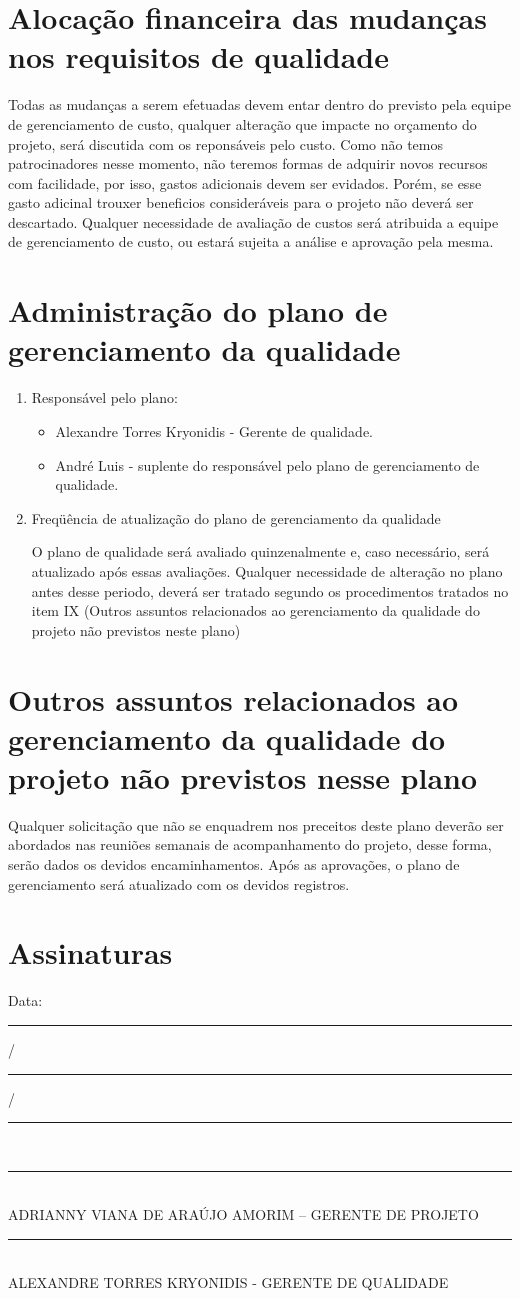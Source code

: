 \documentclass[12pt,openright,oneside,a4paper,brazil]{abntex2}
\begin{document}
\section{Alocação financeira das mudanças nos requisitos de qualidade}
Todas as mudanças a serem efetuadas devem entar dentro do previsto pela equipe de gerenciamento de custo, qualquer alteração que impacte no orçamento do projeto, será discutida com os reponsáveis pelo custo. Como não temos patrocinadores nesse momento, não teremos formas de adquirir novos recursos com facilidade, por isso, gastos adicionais devem ser evidados. Porém, se esse gasto adicinal trouxer beneficios consideráveis para o projeto não deverá ser descartado. Qualquer necessidade de avaliação de custos será atribuida a equipe de gerenciamento de custo, ou estará sujeita a  análise e aprovação pela mesma.

\section{Administração do plano de gerenciamento da qualidade}
\begin{enumerate}
\item Responsável pelo plano:
\begin{itemize}
\item Alexandre Torres Kryonidis - Gerente de qualidade.
\item André Luis - suplente do responsável pelo plano de gerenciamento de qualidade.
\end{itemize}
\item	Freqüência de atualização do plano de gerenciamento da qualidade

O plano de qualidade será avaliado quinzenalmente e, caso necessário, será atualizado após essas avaliações. Qualquer necessidade de alteração no plano antes desse periodo, deverá ser tratado segundo os procedimentos tratados no item IX (Outros assuntos relacionados ao gerenciamento da qualidade do projeto não previstos neste plano)
\end{enumerate}

\section{Outros assuntos relacionados ao gerenciamento da qualidade do projeto não previstos nesse plano}
Qualquer solicitação que não se enquadrem nos preceitos deste plano deverão ser abordados nas reuniões semanais de acompanhamento do projeto, desse forma, serão dados os devidos encaminhamentos. Após as aprovações, o plano de gerenciamento será atualizado com os devidos registros.
\section{Assinaturas}
\begin{center}
Data: \rule{0.5cm}{0.1mm}/\rule{0.5cm}{0.1mm}/\rule{1cm}{0.1mm}     \\
\rule{13cm}{0.1mm}\\
ADRIANNY VIANA DE ARAÚJO AMORIM – GERENTE DE PROJETO\\
\rule{13cm}{0.1mm}\\
ALEXANDRE TORRES KRYONIDIS - GERENTE DE QUALIDADE

\end{center}
\end{document}
